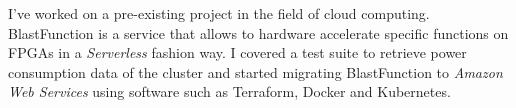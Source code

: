 \documentclass[11pt,a4paper,sans]{moderncv}        %
\begin{document}
{
    I've worked on a pre-existing project in the field of cloud computing. BlastFunction is a service that allows to hardware accelerate specific functions on FPGAs in a \textit{Serverless} fashion way. I covered a test suite to retrieve power consumption data of the cluster and started migrating BlastFunction to \textit{Amazon Web Services} using software such as Terraform, Docker and Kubernetes.
}





\end{document}

